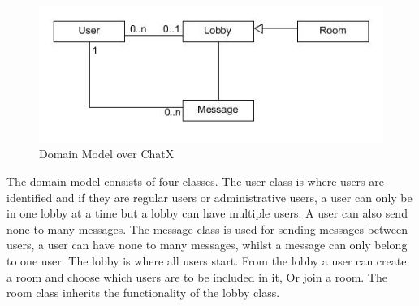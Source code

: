 \begin{figure}[H]
\centering
\includegraphics[width=0.7\linewidth]{img/DomainModelChatX}
\caption{Domain Model over ChatX}
\label{fig:DomainModelChatX}
\end{figure}

The domain model consists of four classes. The user class is where users are identified and if they are regular users or administrative users, a user can only be in one lobby at a time but a lobby can have multiple users. A user can also send none to many messages. The message class is used for sending messages between users, a user can have none to many messages, whilst a message can only belong to one user. The lobby is where all users start. From the lobby a user can create a room and choose which users are to be included in it, Or join a room. The room class inherits the functionality of the lobby class.